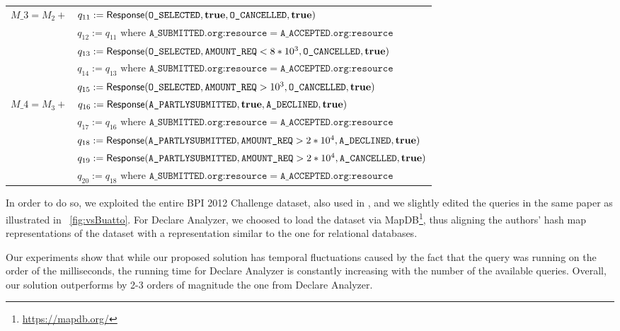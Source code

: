 \begin{table}[!t]
{\begin{tabular}{l|l}
			\toprule
			\multirow{2}{*}{$M\_3=M_2+$} & $q_{11}:= \textsf{Response}(\texttt{O\_SELECTED},\textbf{true},\texttt{O\_CANCELLED},\textbf{true})$ \\&
			$q_{12}:= q_{11} \textrm{ where } \texttt{A\_SUBMITTED.org:resource}=\texttt{A\_ACCEPTED.org:resource}$ \\&
			$q_{13}:= \textsf{Response}(\texttt{O\_SELECTED},\texttt{AMOUNT\_REQ} < 8 * 10^3,\texttt{O\_CANCELLED},\textbf{true})$ \\&
			$q_{14}:= q_{13} \textrm{ where } \texttt{A\_SUBMITTED.org:resource}=\texttt{A\_ACCEPTED.org:resource}$ \\&
			$q_{15}:= \textsf{Response}(\texttt{O\_SELECTED},\texttt{AMOUNT\_REQ} > 10^3,\texttt{O\_CANCELLED},\textbf{true})$ \\
			\toprule
			\multirow{2}{*}{$M\_4=M_3+$} & $q_{16}:= \textsf{Response}(\texttt{A\_PARTLYSUBMITTED},\textbf{true},\texttt{A\_DECLINED},\textbf{true})$ \\&
			$q_{17}:= q_{16} \textrm{ where } \texttt{A\_SUBMITTED.org:resource}=\texttt{A\_ACCEPTED.org:resource}$ \\&
			$q_{18}:= \textsf{Response}(\texttt{A\_PARTLYSUBMITTED},\texttt{AMOUNT\_REQ} > 2 * 10^4,\texttt{A\_DECLINED},\textbf{true})$ \\&
			$q_{19}:= \textsf{Response}(\texttt{A\_PARTLYSUBMITTED},\texttt{AMOUNT\_REQ} > 2 * 10^4,\texttt{A\_CANCELLED},\textbf{true})$ \\&
			$q_{20}:= q_{18} \textrm{ where } \texttt{A\_SUBMITTED.org:resource}=\texttt{A\_ACCEPTED.org:resource}$ \\
	\end{tabular}}
\end{table}


In order to do so, we exploited the entire BPI 2012 Challenge dataset, also used in \cite{BurattinMS16}, and we slightly edited the queries in the same paper as illustrated in \figurename~\ref{fig:vsBuatto}. For Declare Analyzer, we choosed to load the dataset via MapDB\footnote{\url{https://mapdb.org/}}, thus aligning the authors' hash map representations of the dataset with a representation similar to the one for relational databases. 

Our experiments show that while our proposed solution has temporal fluctuations caused by the fact that the query was running on the order of the milliseconds, the running time for Declare Analyzer is constantly increasing with the number of the available queries. Overall, our solution outperforms by 2-3 orders of magnitude the one from Declare Analyzer.


